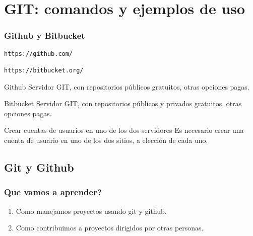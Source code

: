 \documentclass{beamer}
\begin{document}

\section{GIT: comandos y ejemplos de uso} 


\begin{frame}[fragile]
\frametitle{Github y Bitbucket}

\begin{verbatim}
https://github.com/

https://bitbucket.org/
\end{verbatim}

\begin{block}{Github}
Servidor GIT, con repositorios p\'{u}blicos gratuitos, otras opciones pagas.
\end{block}

\begin{block}{Bitbucket}
Servidor GIT, con repositorios p\'{u}blicos y privados gratuitos, otras opciones pagas.
\end{block}

\begin{block}{Crear cuentas de usuarios en uno de los dos servidores}
Es necesario crear una cuenta de usuario en uno de los dos sitios, a elecci\'{o}n de cada uno.
\end{block}

\end{frame}

\subsection{Git y Github}

\begin{frame}
\frametitle{\textquestiondown Que vamos a aprender?}

\begin{enumerate}
\item Como manejamos proyectos usando git y github.
\item Como contribuimos a proyectos dirigidos por otras personas.
\end{enumerate}
\end{frame}
\end{document}
